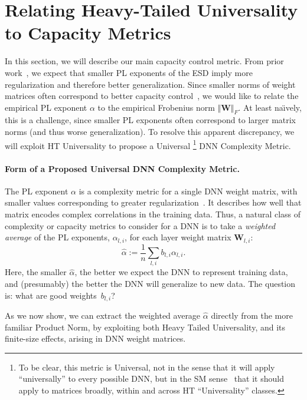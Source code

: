 \section{Relating Heavy-Tailed Universality to Capacity Metrics}
\label{sxn:theory-new}

In this section, we will describe our main capacity control metric.
%
From prior work~\cite{MM18_TR}, we expect that smaller PL exponents of the ESD imply more regularization and therefore better generalization. 
Since smaller norms of weight matrices often correspond to better capacity control~\cite{LMBx18_TR,SHNx17_TR,PLMx18_TR,BFT17_TR}, we would like to relate the empirical PL exponent $\alpha$ to the empirical Frobenius norm $\Vert\mathbf{W}\Vert_{F}$.
At least na\"{\i}vely, this is a challenge, since smaller PL exponents often correspond to larger matrix norms (and thus worse generalization).
To resolve this apparent discrepancy, we will exploit HT Universality to propose a Universal%
\footnote{To be clear, this metric is Universal, not in the sense that it will apply ``universally'' to every possible DNN, but in the SM sense~\cite{SornetteBook,BouchaudPotters03} that it should apply to matrices broadly, within and across HT ``Universality'' classes.}
DNN Complexity Metric.


\paragraph{Form of a Proposed Universal DNN Complexity Metric.} 

The PL exponent $\alpha$ is a complexity metric for a single DNN weight matrix, with smaller values corresponding to greater regularization~\cite{MM18_TR}.
It describes how well that matrix encodes complex correlations in the training data.
Thus, a natural class of complexity or capacity metrics to consider for a DNN is to take a \emph{weighted average} of the PL exponents, $\alpha_{l,i}$, for each layer weight matrix $\mathbf{W}_{l,i}$:
\begin{equation}
\hat{\alpha}:=\dfrac{1}{n}\sum_{l,i}b_{l,i}\alpha_{l,i}  .
\label{eqn:alpha_hat_generic}
\end{equation}
Here, the smaller $\hat{\alpha}$, the better we expect the DNN to represent training data, and (presumably) the better the DNN will generalize to new data.
The question is: what are good weights~$b_{l,i}$?

As we now show, we can extract the weighted average $\hat{\alpha}$ directly from the more familiar Product Norm, by exploiting both Heavy Tailed Universality, and its finite-size effects, arising
in DNN weight matrices.

